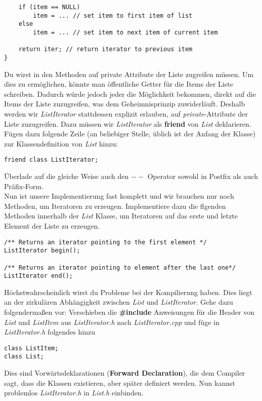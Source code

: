 \documentclass[
  accentcolor=tud1c,	%
  colorbacktitle,		%
  inverttitle,			%
  german,				%
  twoside
]{tudexercise}
\begin{document}
\begin{enumerate}
\begin{lstlisting}
	if (item == NULL)
		item = ... // set item to first item of list
	else
		item = ... // set item to next item of current item
	
	return iter; // return iterator to previous item
}
\end{lstlisting} 

Du wirst in den Methoden auf private Attribute der Liste zugreifen müssen. Um dies zu ermöglichen, könnte man öffentliche Getter für die Items der Liste schreiben.
Dadurch würde jedoch jeder die Möglichkeit bekommen, direkt auf die Items der Liste zuzugreifen, was dem Geheimnisprinzip zuwiderläuft.
Deshalb werden wir \emph{ListIterator} stattdessen explizit erlauben, auf \emph{private}-Attribute der Liste zuzugreifen.
Dazu müssen wir \emph{ListIterator} als \textbf{friend} von \emph{List} deklarieren.
Fügen dazu folgende Zeile (an beliebiger Stelle, üblich ist der Anfang der Klasse) zur Klassendefinition von \emph{List} hinzu:
\begin{lstlisting}
friend class ListIterator;
\end{lstlisting}

Überlade auf die gleiche Weise auch den \textbf{$--$} Operator sowohl in Postfix als auch Präfix-Form. \\

Nun ist unsere Implementierung fast komplett und wir brauchen nur noch Methoden, um Iteratoren zu erzeugen.
Implementiere dazu die flgenden Methoden innerhalb der \emph{List} Klasse, um Iteratoren auf das erste und letzte Element der Liste zu erzeugen. 
\begin{lstlisting}
/** Returns an iterator pointing to the first element */
ListIterator begin();

/** Returns an iterator pointing to element after the last one*/
ListIterator end();
\end{lstlisting} 

Höchstwahrscheinlich wirst du Probleme bei der Kompilierung haben.
Dies liegt an der zirkulären Abhängigkeit zwischen \emph{List} und \emph{ListIterator}.
Gehe dazu folgendermaßen vor: 
Verschieben die \textbf{\#include} Anweisungen für die Header von \emph{List} und \emph{ListItem} aus \emph{ListIterator.h} nach \emph{ListIterator.cpp} und füge in \emph{ListIterator.h} folgendes hinzu

\begin{lstlisting}
class ListItem;
class List;
\end{lstlisting}

Dies sind Vorwärtsdeklarationen (\textbf{Forward Declaration}), die dem Compiler sagt, dass die Klassen existieren, aber später definiert werden. Nun kannst problemlos \emph{ListIterator.h} in \emph{List.h} einbinden. 


\end{enumerate}
\end{document}
